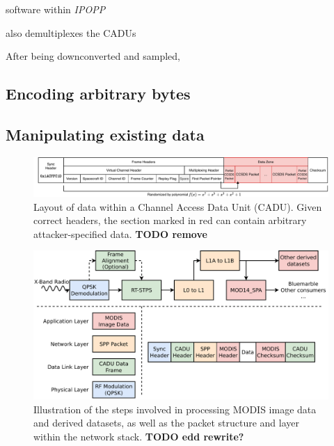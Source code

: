software within \textit{IPOPP}




also demultiplexes the CADUs

After being downconverted and sampled,




\subsection{Encoding arbitrary bytes}

\subsection{Manipulating existing data}


\begin{figure}
    \centering
    \includegraphics[width=\textwidth]{diagrams/cadu_diagram.pdf}
    \caption{Layout of data within a Channel Access Data Unit (CADU). Given correct headers, the section marked in red can contain arbitrary attacker-specified data. \textbf{TODO remove}}
    \label{fig:cadu_diagram}
\end{figure}

\begin{figure}
    \centering
    \includegraphics[width=\linewidth]{diagrams/attack_types.pdf}
    \caption{Illustration of the steps involved in processing MODIS image data and derived datasets, as well as the packet structure and layer within the network stack. \textbf{TODO edd rewrite?}}
    \label{fig:attack_types}
\end{figure}

